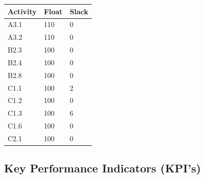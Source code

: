 \documentclass{article}
\begin{document}
\begin{table}[H]
\begin{tabular}{|l|l|l|}
  \end{tabular}
  \begin{tabular}{|l|l|l|}
    \hline
    \textbf{Activity} & \textbf{Float} & \textbf{Slack}  \\ \hline  
      \rowcolor{green!30} A3.1 & 110 & 0 \\ \hline
      \rowcolor{green!30} A3.2 & 110 & 0 \\ \hline
      \rowcolor{blue!20}B2.3 & 100 & 0 \\ \hline
      \rowcolor{blue!20}B2.4 & 100 & 0 \\ \hline
      \rowcolor{blue!20}B2.8 & 100 & 0 \\ \hline
      \rowcolor{red!10}C1.1 & 100 & 2 \\ \hline
      \rowcolor{red!10}C1.2 & 100 & 0 \\ \hline
      \rowcolor{red!10}C1.3 & 100 & 6 \\ \hline
      \rowcolor{red!10}C1.6 & 100 & 0 \\ \hline
      \rowcolor{red!20}C2.1 & 100 & 0 \\ \hline

  \end{tabular} 
  \end{table}

  \subsection{Key Performance Indicators (KPI's)}
\end{document}
